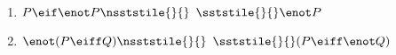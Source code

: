 \begin{enumerate}[label=(\arabic*)]
\item $P \eif \enot P \nsststile{}{} \hspace{.5em} \sststile{}{}  \enot P $ %

%
%
%
%
%

\item $\enot (P \eiff Q) \nsststile{}{} \hspace{.5em} \sststile{}{} (P \eiff \enot Q) $ %


\end{enumerate}
